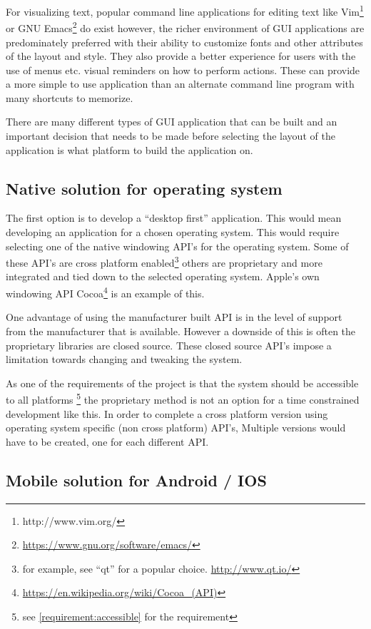 For visualizing text, popular command line applications for editing text like
Vim\footnote{http://www.vim.org/} or GNU
Emacs\footnote{\url{https://www.gnu.org/software/emacs/}} do exist however, the
richer environment of GUI applications are predominately preferred with their
ability to customize fonts and other attributes of the layout and style. They
also provide a better experience for users with the use of menus etc. visual
reminders on how to perform actions. These can provide a more simple to use
application than an alternate command line program with many shortcuts to
memorize.

There are many different types of GUI application that can be built and
an important decision that needs to be made before selecting the layout
of the application is what platform to build the application on.

\subsection{Native solution for operating
system}\label{native-solution-for-operating-system}

The first option is to develop a ``desktop first'' application. This would mean
developing an application for a chosen operating system. This would require
selecting one of the native windowing API's for the operating system. Some of
these API's are cross platform enabled\footnote{for example, see ``qt'' for a
popular choice. \url{http://www.qt.io/}} others are proprietary and more
integrated and tied down to the selected operating system. Apple's own windowing
API Cocoa\footnote{\url{https://en.wikipedia.org/wiki/Cocoa_(API)}} is an
example of this.

One advantage of using the manufacturer built API is in the level of support
from the manufacturer that is available. However a downside of this is often the
proprietary libraries are closed source. These closed source API's impose a
limitation towards changing and tweaking the system.

As one of the requirements of the project is that the system should be
accessible to all platforms \footnote{ see \ref{requirement:accessible} for the
requirement} the proprietary method is not an option for a time constrained
development like this. In order to complete a cross platform version using
operating system specific (non cross platform) API's, Multiple versions would
have to be created, one for each different API.

\subsection{Mobile solution for Android / IOS}%
\label{mobile-solution-for-android-ios}

